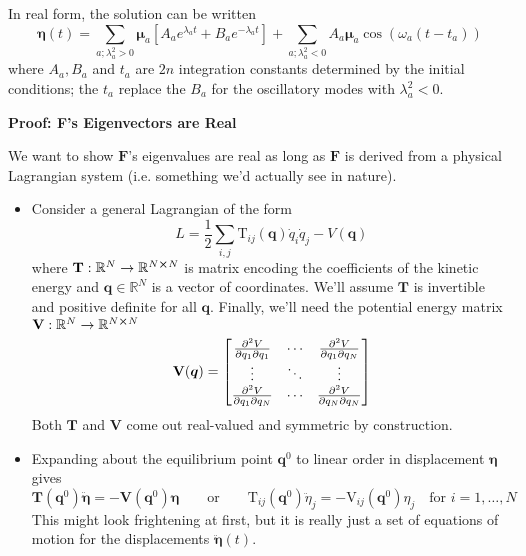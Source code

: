 \documentclass[11pt, a4paper]{article}
\newcommand{\eqtext}[1]{\qquad \text{#1} \qquad}
\newcommand{\R}{\mathbb{R}} %
\newcommand{\bddot}[1]{\ddot{\bm{#1}}} %
\newcommand{\mat}[1]{\mathbf{#1}} %
\begin{document}
\begin{itemize}
	In real form, the solution can be written
	\begin{equation*}
		\bm{\eta}(t) = \sum_{a; \lambda_{a}^{2} > 0} \bm{\mu}_{a} \left[A_a e^{\lambda_a t} + B_a e^{ -\lambda_a t}\right] + \sum_{a; \lambda_{a}^{2} < 0}  A_a \bm{\mu}_{a} \cos (\omega_a (t - t_a))
	\end{equation*}
	where $ A_a, B_a $ and $ t_{a} $ are $ 2n $ integration constants determined by the initial conditions; the $ t_{a} $ replace the $ B_{a} $ for the oscillatory modes with $ \lambda_{a}^{2} < 0 $.
\end{itemize}
\textbf{Proof: F's Eigenvectors are Real}
\smallskip 

We want to show $ \mat{F} $'s eigenvalues are real as long as $ \mat{F} $ is derived from a physical Lagrangian system (i.e. something we'd actually see in nature).
\begin{itemize}
	\item Consider a general Lagrangian of the form
	\begin{equation*}
		L = \frac{1}{2}\sum_{i, j} \mathrm{T}_{ij}(\bm{q}) \dot{q}_i \dot{q}_j - V(\bm{q})
	\end{equation*}
	where $ \mat{T}: \R^{N} \to \R^{N \cross N} $ is matrix encoding the coefficients of the kinetic energy and $ \bm{q} \in \R^{N} $ is a vector of coordinates. We'll assume $ \mat{T} $ is invertible and positive definite for all $ \bm{q} $. Finally, we'll need the potential energy matrix $ \mat{V}: \R^{N} \to \R^{N \cross N} $
	\begin{equation*}
		\mat{V}(\bm{q}) =
		\begin{bmatrix}
			\pdv{V}{q_1}{q_{1}} & \cdots & \pdv{V}{q_{1}}{q_N}\\
			\vdots & \ddots & \vdots\\
			\pdv{V}{q_1}{q_{N}} & \cdots & \pdv{V}{q_N}{q_{N}}\\
		\end{bmatrix}
	\end{equation*}
	Both $ \mat{T} $ and $ \mat{V} $ come out real-valued and symmetric by construction.
	
	\item Expanding about the equilibrium point $ \bm{q}^{0} $ to linear order in displacement $ \bm{\eta} $ gives
	\begin{equation*}
		\mat{T}(\bm{q}^{0}) \bddot{\eta} = -\mat{V}(\bm{q}^{0}) \bm{\eta} \eqtext{or} \mathrm{T}_{ij}(\bm{q}^{0}) \ddot{\eta}_{j} = - \mathrm{V}_{ij}(\bm{q}^{0}) \eta_{j} \quad \text{for } i = 1, \ldots, N
	\end{equation*}
	This might look frightening at first, but it is really just a set of equations of motion for the displacements $ \bddot{\eta}(t) $.
	

\end{itemize}
\end{document}
